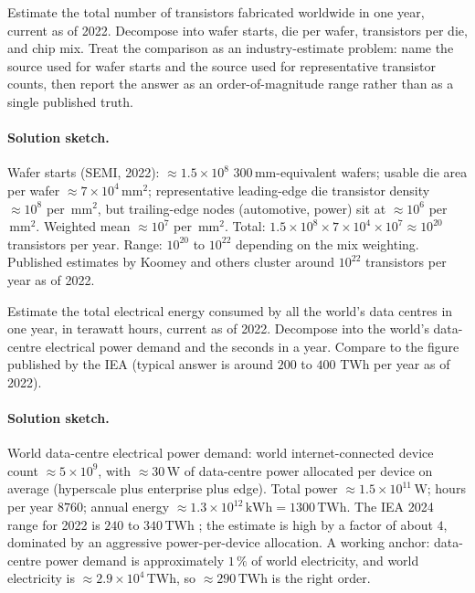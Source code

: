 \begin{exercise}
Estimate the total number of transistors fabricated worldwide in
one year, current as of 2022. Decompose into wafer starts, die per
wafer, transistors per die, and chip mix. Treat the comparison as
an industry-estimate problem: name the source used for wafer starts
and the source used for representative transistor counts, then
report the answer as an order-of-magnitude range rather than as a
single published truth.
\end{exercise}

\paragraph{Solution sketch.}
Wafer starts (SEMI, 2022): $\approx 1.5 \times 10^{8}$
$300\,\si{\milli\meter}$-equivalent wafers; usable die area per
wafer $\approx 7 \times 10^{4} \,\si{\milli\meter\squared}$;
representative leading-edge die transistor density $\approx 10^{8}$
per $\,\si{\milli\meter\squared}$, but trailing-edge nodes
(automotive, power) sit at $\approx 10^{6}$ per $\,\si{\milli\meter\squared}$.
Weighted mean $\approx 10^{7}$ per $\,\si{\milli\meter\squared}$.
Total: $1.5 \times 10^{8} \times 7 \times 10^{4} \times 10^{7}
\approx 10^{20}$ transistors per year. Range: $10^{20}$ to $10^{22}$
depending on the mix weighting. Published estimates by Koomey and
others cluster around $10^{22}$ transistors per year as of 2022.

\begin{exercise}
Estimate the total electrical energy consumed by all the world's
data centres in one year, in terawatt hours, current as of 2022.
Decompose into the world's data-centre electrical power demand and
the seconds in a year. Compare to the figure published by the IEA
(typical answer is around $200$ to $400$ TWh per year as of 2022).
\end{exercise}

\paragraph{Solution sketch.}
World data-centre electrical power demand: world internet-connected
device count $\approx 5 \times 10^{9}$, with $\approx 30 \,\si{\watt}$
of data-centre power allocated per device on average (hyperscale
plus enterprise plus edge). Total power $\approx 1.5 \times 10^{11}
\,\si{\watt}$; hours per year $8760$; annual energy $\approx 1.3
\times 10^{12} \,\text{kWh} = 1300 \,\text{TWh}$. The IEA 2024
range for 2022 is $240$ to $340 \,\text{TWh}$
\cite{data:ch09-iea-data-centres-2024}; the estimate is high by a
factor of about $4$, dominated by an aggressive
power-per-device allocation. A working anchor: data-centre power
demand is approximately $1\,\%$ of world electricity, and world
electricity is $\approx 2.9 \times 10^{4} \,\text{TWh}$, so
$\approx 290 \,\text{TWh}$ is the right order.


